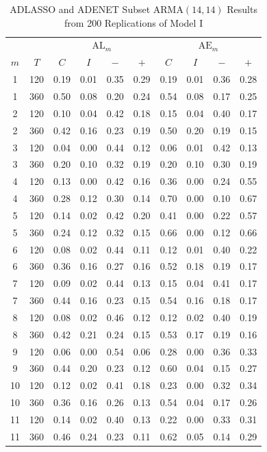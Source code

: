 \begin{table}[htbp]
\footnotesize
\centering
\caption{ADLASSO and ADENET Subset ARMA$(14,14)$ Results from 200 Replications of Model I}
\begin{tabular}{cc|cccc|cccc}
  \hline
  & & \multicolumn{4}{c|}{$\textrm{AL}_m$} & \multicolumn{4}{c}{$\textrm{AE}_m$} \\
  \cline{4-5}  \cline{8-9}
  $m$ & $T$ & $C$ & $I$ & $-$ & $+$ & $C$ & $I$ & $-$ & $+$ \\
  \hline
  1 & 120 & 0.19 & 0.01 & 0.35 & 0.29 & 0.19 & 0.01 & 0.36 & 0.28 \\ 
  1 & 360 & 0.50 & 0.08 & 0.20 & 0.24 & 0.54 & 0.08 & 0.17 & 0.25 \\ 
  2 & 120 & 0.10 & 0.04 & 0.42 & 0.18 & 0.15 & 0.04 & 0.40 & 0.17 \\ 
  2 & 360 & 0.42 & 0.16 & 0.23 & 0.19 & 0.50 & 0.20 & 0.19 & 0.15 \\ 
  3 & 120 & 0.04 & 0.00 & 0.44 & 0.12 & 0.06 & 0.01 & 0.42 & 0.13 \\ 
  3 & 360 & 0.20 & 0.10 & 0.32 & 0.19 & 0.20 & 0.10 & 0.30 & 0.19 \\
  	\hline 
  4 & 120 & 0.13 & 0.00 & 0.42 & 0.16 & 0.36 & 0.00 & 0.24 & 0.55 \\ 
  4 & 360 & 0.28 & 0.12 & 0.30 & 0.14 & 0.70 & 0.00 & 0.10 & 0.67 \\ 
  5 & 120 & 0.14 & 0.02 & 0.42 & 0.20 & 0.41 & 0.00 & 0.22 & 0.57 \\ 
  5 & 360 & 0.24 & 0.12 & 0.32 & 0.15 & 0.66 & 0.00 & 0.12 & 0.66 \\ 
  \hline
  6 & 120 & 0.08 & 0.02 & 0.44 & 0.11 & 0.12 & 0.01 & 0.40 & 0.22 \\ 
  6 & 360 & 0.36 & 0.16 & 0.27 & 0.16 & 0.52 & 0.18 & 0.19 & 0.17 \\ 
  7 & 120 & 0.09 & 0.02 & 0.44 & 0.13 & 0.15 & 0.04 & 0.41 & 0.17 \\ 
  7 & 360 & 0.44 & 0.16 & 0.23 & 0.15 & 0.54 & 0.16 & 0.18 & 0.17 \\ 
  8 & 120 & 0.08 & 0.02 & 0.46 & 0.12 & 0.12 & 0.02 & 0.40 & 0.19 \\ 
  8 & 360 & 0.42 & 0.21 & 0.24 & 0.15 & 0.53 & 0.17 & 0.19 & 0.16 \\ 
  \hline
  9 & 120 & 0.06 & 0.00 & 0.54 & 0.06 & 0.28 & 0.00 & 0.36 & 0.33 \\ 
  9 & 360 & 0.44 & 0.20 & 0.23 & 0.12 & 0.60 & 0.04 & 0.15 & 0.27 \\ 
  10 & 120 & 0.12 & 0.02 & 0.41 & 0.18 & 0.23 & 0.00 & 0.32 & 0.34 \\ 
  10 & 360 & 0.36 & 0.16 & 0.26 & 0.13 & 0.54 & 0.04 & 0.17 & 0.26 \\ 
  11 & 120 & 0.14 & 0.02 & 0.40 & 0.13 & 0.22 & 0.00 & 0.33 & 0.31 \\ 
  11 & 360 & 0.46 & 0.24 & 0.23 & 0.11 & 0.62 & 0.05 & 0.14 & 0.29 \\ 
   \hline
\end{tabular}
\label{tab:alaemod1}
\end{table}

